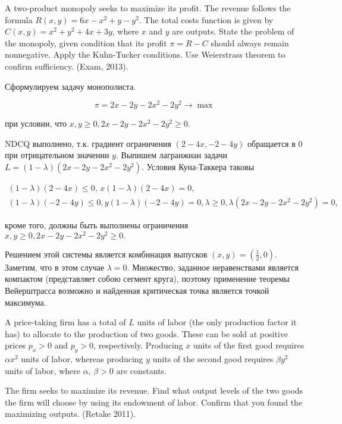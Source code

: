\begin{problem} 
A two-product monopoly seeks to maximize its profit. The revenue follows the formula $R(x,y)=6x-x^{2} +y-y^{2} $. The total costs function is given by $C(x,y)=x^{2} +y^{2} +4x+3y$, where $x$ and $y$ are outputs. State the problem of the monopoly, given condition that its profit $\pi =R-C$ should always remain nonnegative. Apply the Kuhn-Tucker conditions. Use Weierstrass theorem to confirm sufficiency. (Exam, 2013).
\end{problem}

\begin{solution}
Сформулируем задачу монополиста.

\[\pi =2x-2y-2x^{2} -2y^{2} \to \max \] 

при условии, что $x,y\ge 0,  2x-2y-2x^{2} -2y^{2} \ge 0.$

NDCQ выполнено, т.к. градиент ограничения $(2-4x,-2-4y)$ обращается в 0 при отрицательном значении $y$. Выпишем лагранжиан задачи $L=(1-\lambda )(2x-2y-2x^{2} -2y^{2} )$. Условия Куна-Таккера таковы

\[\begin{array}{l} {(1-\lambda )(2-4x)\le 0,\, x(1-\lambda )(2-4x)=0,} \\ {(1-\lambda )(-2-4y)\le 0,  y(1-\lambda )(-2-4y)=0,  \lambda \ge 0,  \lambda (2x-2y-2x^{2} -2y^{2} )=0,} \end{array}\] 

кроме того, должны быть выполнены ограничения $x,y\ge 0,  2x-2y-2x^{2} -2y^{2} \ge 0.$

Решением этой системы является комбинация выпусков $(x,y)=(\frac{1}{2} ,0)$. Заметим, что в этом случае $\lambda =0$. Множество, заданное неравенствами является компактом (представляет собою сегмент круга), поэтому применение теоремы Вейерштрасса возможно и найденная критическая точка является точкой максимума.
\end{solution}

\begin{problem}
A price-taking firm has a total of $L$ units of labor (the only production factor it has) to allocate to the production of two goods. These can be sold at positive prices $p_{x} >0$ and $p_{y} >0$, respectively. Producing $x$ units of the first good requires $\alpha x^{2} $ units of labor, whereas producing  $y$ units of the second good requires $\beta y^{2} $ units of labor, where $\alpha$, $\beta >0$ are constants.

The firm seeks to maximize its revenue. Find what output levels of the two goods the firm will choose by using its endowment of labor. Confirm that you found the maximizing outputs. (Retake 2011).
\end{problem}

